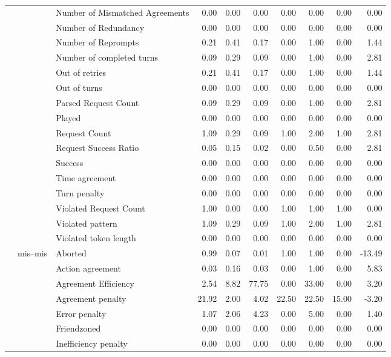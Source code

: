 \begin{tabular}{lllrrrrrrr}
 &  & Number of Mismatched Agreements & 0.00 & 0.00 & 0.00 & 0.00 & 0.00 & 0.00 & 0.00 \\
 &  & Number of Redundancy & 0.00 & 0.00 & 0.00 & 0.00 & 0.00 & 0.00 & 0.00 \\
 &  & Number of Reprompts & 0.21 & 0.41 & 0.17 & 0.00 & 1.00 & 0.00 & 1.44 \\
 &  & Number of completed turns & 0.09 & 0.29 & 0.09 & 0.00 & 1.00 & 0.00 & 2.81 \\
 &  & Out of retries & 0.21 & 0.41 & 0.17 & 0.00 & 1.00 & 0.00 & 1.44 \\
 &  & Out of turns & 0.00 & 0.00 & 0.00 & 0.00 & 0.00 & 0.00 & 0.00 \\
 &  & Parsed Request Count & 0.09 & 0.29 & 0.09 & 0.00 & 1.00 & 0.00 & 2.81 \\
 &  & Played & 0.00 & 0.00 & 0.00 & 0.00 & 0.00 & 0.00 & 0.00 \\
 &  & Request Count & 1.09 & 0.29 & 0.09 & 1.00 & 2.00 & 1.00 & 2.81 \\
 &  & Request Success Ratio & 0.05 & 0.15 & 0.02 & 0.00 & 0.50 & 0.00 & 2.81 \\
 &  & Success & 0.00 & 0.00 & 0.00 & 0.00 & 0.00 & 0.00 & 0.00 \\
 &  & Time agreement & 0.00 & 0.00 & 0.00 & 0.00 & 0.00 & 0.00 & 0.00 \\
 &  & Turn penalty & 0.00 & 0.00 & 0.00 & 0.00 & 0.00 & 0.00 & 0.00 \\
 &  & Violated Request Count & 1.00 & 0.00 & 0.00 & 1.00 & 1.00 & 1.00 & 0.00 \\
 &  & Violated pattern & 1.09 & 0.29 & 0.09 & 1.00 & 2.00 & 1.00 & 2.81 \\
 &  & Violated token length & 0.00 & 0.00 & 0.00 & 0.00 & 0.00 & 0.00 & 0.00 \\
\cline{2-10}
 & \multirow[t]{27}{*}{mis--mis} & Aborted & 0.99 & 0.07 & 0.01 & 1.00 & 1.00 & 0.00 & -13.49 \\
 &  & Action agreement & 0.03 & 0.16 & 0.03 & 0.00 & 1.00 & 0.00 & 5.83 \\
 &  & Agreement Efficiency & 2.54 & 8.82 & 77.75 & 0.00 & 33.00 & 0.00 & 3.20 \\
 &  & Agreement penalty & 21.92 & 2.00 & 4.02 & 22.50 & 22.50 & 15.00 & -3.20 \\
 &  & Error penalty & 1.07 & 2.06 & 4.23 & 0.00 & 5.00 & 0.00 & 1.40 \\
 &  & Friendzoned & 0.00 & 0.00 & 0.00 & 0.00 & 0.00 & 0.00 & 0.00 \\
 &  & Inefficiency penalty & 0.00 & 0.00 & 0.00 & 0.00 & 0.00 & 0.00 & 0.00 \\

\end{tabular}
